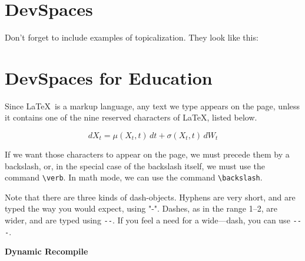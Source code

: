 \documentclass[12pt]{article}
\begin{document}
\section*{DevSpaces}

Don't forget to include examples of topicalization.
They look like this:

{\small
{}
}


\section{DevSpaces for Education}
Since \LaTeX\ is a markup language, any text we
type appears on the page, unless it contains
one of the nine reserved characters of \LaTeX, listed
below.

\begin{equation}
dX_{t}=\mu (X_{t},t)\,dt+\sigma (X_{t},t)\,dW_{t}
\end{equation}

If we want those characters to appear on the page, we
must precede them by a backslash, or, in the special
case of the backslash itself, we must use the 
command \verb(\verb(.  In math mode, we can use the command
\verb(\backslash(.

Note that there are three kinds of dash-objects.  Hyphens 
are very short, and are typed the way you would expect, using
"-".  Dashes, as in the range 1--2, are wider, and are typed
using \verb+--+.  If you feel a need for a wide---dash, you can
use \verb+---+.

\textbf{Dynamic Recompile}

\end{document}
